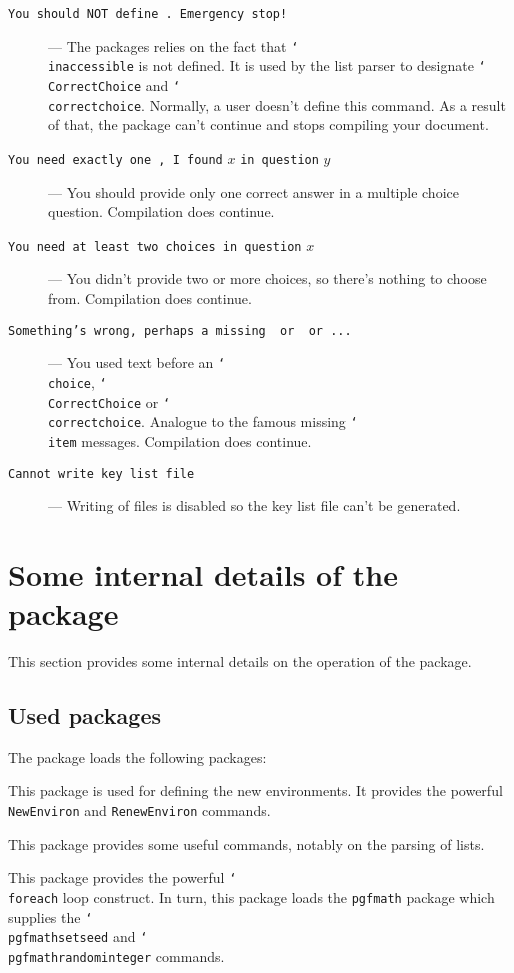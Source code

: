 \documentclass[12pt,a4paper]{exam}
\providecommand{\texorpdfstring}[2]{#1}
\newcommand{\bs}{\texorpdfstring{\char`\\}{}}
\begin{document}
\begin{description}
\item[\texttt{You should NOT define \string\inaccessible. Emergency stop!}] ---
The packages relies on the fact that \texttt{\bs inaccessible} is not defined. It is
used by the list parser to designate \texttt{\bs CorrectChoice} and
\texttt{\bs correctchoice}. Normally, a user doesn't define this command.
As a result of that, the package can't continue and stops compiling your document.

\item[\texttt{You need exactly one \string\CorrectChoice, I found} $x$
      \texttt{in question} $y$] --- You should provide only one correct
answer in a multiple choice question. Compilation does continue.

\item[\texttt{You need at least two choices in question} $x$] --- You didn't
provide two or more choices, so there's nothing to choose from. Compilation
does continue.     

\item[\texttt{Something's wrong, perhaps a missing \string\choice\ or \string\CorrectChoice\ or ...}] --- You used text before an \texttt{\bs choice}, \texttt{\bs CorrectChoice}
or \texttt{\bs correctchoice}. Analogue to the famous missing \texttt{\bs item} messages.
 Compilation does continue.
 
\item[\texttt{Cannot write key list file}] --- Writing of files is disabled so the key list file can't be generated.
 
\end{description}



\section{Some internal details of the package}
This section provides some internal details on the operation of the package.

\subsection{Used packages}
The package loads the following packages:

\begin{description}[labelindent=2ex]
\item[\texttt{environ}] This package is used for defining the new environments. It provides
the powerful \texttt{NewEnviron} and \texttt{RenewEnviron} commands.
\item[\texttt{etoolbox}] This package provides some useful commands, notably on the parsing of lists.
\item[\texttt{pgffor}] This package provides the powerful \texttt{\bs foreach} loop
construct. In turn, this package loads the \texttt{pgfmath} package which supplies
the \texttt{\bs pgfmathsetseed} and \linebreak \texttt{\bs pgfmathrandominteger} commands.
\end{description}
\end{document}
